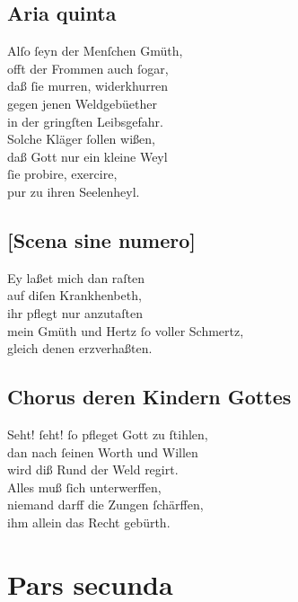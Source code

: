 \documentclass{ees}
\newenvironment{lyrics}[1]{%
  \subsection{#1}\nopagebreak%
  \begin{lyricslist}%
  \let\voice\item%
}{%
  \end{lyricslist}%
}
\begin{document}
\begin{lyrics}{Aria quinta}
  \voice[Eliphas]
  Alſo ſeyn der Menſchen Gmüth,\\
  offt der Frommen auch ſogar,\\
  daß ſie murren, widerkhurren\\
  gegen jenen Weldgebüether\\
  in der gringſten Leibsgefahr.\\[1ex]
  Solche Kläger ſollen wißen,\\
  daß Gott nur ein kleine Weyl\\
  ſie probire, exercire,\\
  pur zu ihren Seelenheyl.
\end{lyrics}

\begin{lyrics}{[Scena sine numero]}
  \voice[Job]
  Ey laßet mich dan raſten\\
  auf diſen Krankhenbeth,\\
  ihr pflegt nur anzutaſten\\
  mein Gmüth und Hertz ſo voller Schmertz,\\
  gleich denen erzverhaßten.
\end{lyrics}

\begin{lyrics}{Chorus deren Kindern Gottes}
  \voice[Die Kinder Gottes]\enlargethispage\baselineskip
  Seht! ſeht! ſo pfleget Gott zu ſtihlen,\\
  dan nach ſeinen Worth und Willen\\
  wird diß Rund der Weld regirt.\\
  Alles muß ſich unterwerffen,\\
  niemand darff die Zungen ſchärffen,\\
  ihm allein das Recht gebürth.
\end{lyrics}

\section{Pars secunda}
\end{document}
